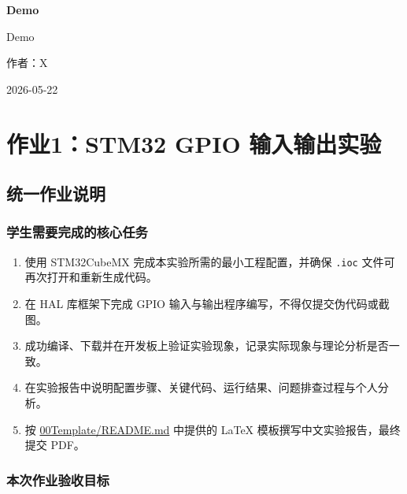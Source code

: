 \documentclass[
  chinese,
  UTF8,
  oneside,
  openany]{ctexbook}
\author{}
\date{}
\providecommand{\tightlist}{%
  \setlength{\itemsep}{0pt}\setlength{\parskip}{0pt}}
\begin{document}
\frontmatter

\mainmatter
\begin{titlepage}
\centering
\vspace*{3.5cm}
{\Huge\bfseries Demo\par}
\vspace{1.2cm}
{\Large Demo\par}
\vfill
{\Large 作者：X\par}
\vspace{0.3cm}
{\Large 2026-05-22\par}
\end{titlepage}

\frontmatter
\tableofcontents
\clearpage
\mainmatter

\chapter{作业1：STM32 GPIO
输入输出实验}\label{ux4f5cux4e1a1stm32-gpio-ux8f93ux5165ux8f93ux51faux5b9eux9a8c}

\section{统一作业说明}\label{ux7edfux4e00ux4f5cux4e1aux8bf4ux660e}

\subsection{学生需要完成的核心任务}\label{ux5b66ux751fux9700ux8981ux5b8cux6210ux7684ux6838ux5fc3ux4efbux52a1}

\begin{enumerate}
\def\labelenumi{\arabic{enumi}.}
\tightlist
\item
  使用 STM32CubeMX 完成本实验所需的最小工程配置，并确保 \texttt{.ioc}
  文件可再次打开和重新生成代码。
\item
  在 HAL 库框架下完成 GPIO 输入与输出程序编写，不得仅提交伪代码或截图。
\item
  成功编译、下载并在开发板上验证实验现象，记录实际现象与理论分析是否一致。
\item
  在实验报告中说明配置步骤、关键代码、运行结果、问题排查过程与个人分析。
\item
  按 \href{../00Template/README.md}{00Template/README.md} 中提供的 LaTeX
  模板撰写中文实验报告，最终提交 PDF。
\end{enumerate}

\subsection{本次作业验收目标}\label{ux672cux6b21ux4f5cux4e1aux9a8cux6536ux76eeux6807}
\end{document}
